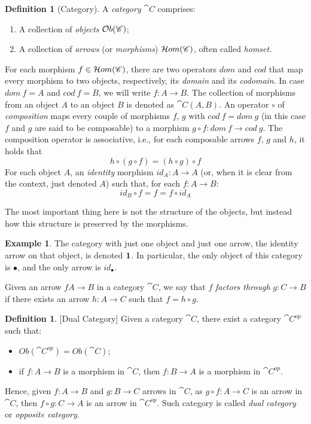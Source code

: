 \documentclass[a4paper, twoside,openright]{report}
\theoremstyle{plain}
\theoremstyle{definition}
\newtheorem{definition}[theorem]{Definition}
\newtheorem{example}[theorem]{Example}
\begin{document}
\begin{definition}[Category]\label{def:category}
    A \emph{category} $\cat{C}$ comprises:
    \begin{enumerate}
        \item A collection of \emph{objects} $\mathcal{O}b(\mathscr{C})$;
        \item A collection of \emph{arrows} (or \emph{morphisms}) $\mathcal{H}om(\mathscr{C})$, often called \emph{homset}.
    \end{enumerate}
    For each morphism $f \in \mathcal{H}om(\mathscr{C})$, there are two operators $dom$ and $cod$ that map every morphism to two objects, respectively, its \emph{domain} and its \emph{codomain}. In case $dom\ f = A$ and $cod\ f = B$, we will write $f: A \rightarrow B$. The collection of morphisms from an object $A$ to an object $B$ is denoted as $\cat{C}(A, B)$.
    An operator $\circ$ of \emph{composition} maps every couple of morphisms $f$, $g$ with $cod\ f = dom \ g$ (in this case $f$ and $g$ are said to be composable) to a morphism $g \circ f : dom\ f \rightarrow cod \ g$. The composition operator is associative, i.e., for each composable arrows $f$, $g$ and $h$, it holds that
    $$
        h \circ (g \circ f) = (h\circ g) \circ f
    $$
    For each object $A$, an \emph{identity} morphism $id_A : A \rightarrow A$ (or, when it is clear from the context, just denoted $A$)  such that, for each $f: A \rightarrow B$:
    \[
        id_B \circ f = f = f \circ id_A 
    \]
\end{definition}

The most important thing here is not the structure of the objects, but instead how this structure is preserved by the morphisms.

\begin{example}\label{ex:1_cat}
    The category with just one object and just one arrow, the identity arrow on that object, is denoted $\textbf 1$. In particular, the only object of this category is $\bullet$, and the only arrow is $id_{\bullet}$.
\end{example}

Given an arrow $f A \rightarrow B$ in a category $\cat C$, we say that $f$ \emph{factors through} $g: C \rightarrow B$ if there exists an arrow $h: A \rightarrow C$ such that $f = h \circ g$.

\begin{definition}\label{def:dual_cat}[Dual Category]
    Given a category $\cat C$, there exist a category $\cat C^{op}$ such that:
    \begin{itemize}
        \item $Ob(\cat C^{op}) = Ob(\cat C)$;
        \item if $f: A \rightarrow B$ is a morphism in $\cat C$, then $f: B\rightarrow A$ is a morphism in $\cat C ^ {op}$.
    \end{itemize}
    Hence, given $f : A \rightarrow B$ and $g: B \rightarrow C$ arrows in $\cat C$, as $g \circ f: A \rightarrow C$ is an arrow in $\cat C$, then $f \circ g: C \rightarrow A$ is an arrow in $\cat C ^{op}$.
    Such category is called \emph{dual category} or \emph{opposite category}.
\end{definition}
\end{document}
